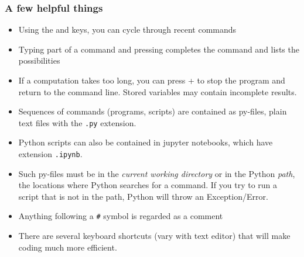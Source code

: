  {\nologo
 \begin{frame}[fragile]
  \frametitle{A few helpful things}
  \begin{itemize}[<+->]
    \item Using the \keystroke{$\uparrow$} and \keystroke{$\downarrow$} keys, you can cycle through recent commands
    \item Typing part of a command and pressing  completes the command and lists the possibilities
    \item If a computation takes too long, you can press + to stop the program and return to the command line. Stored variables may contain incomplete results.
    \item Sequences of commands (programs, scripts) are contained as py-files, plain text files with the \lstinline$.py$ extension.
    \item Python scripts can also be contained in jupyter notebooks, which have extension \lstinline$.ipynb$.
    \item Such py-files must be in the \emph{current working directory} or in the Python \emph{path}, the locations where Python searches for a command. If you try to run a script that is not in the path, Python will throw an Exception/Error.
    \item Anything following a \lstinline$#$ symbol is regarded as a comment
    \item There are several keyboard shortcuts (vary with text editor) that will make coding much more efficient.
  \end{itemize}
\end{frame}
}

